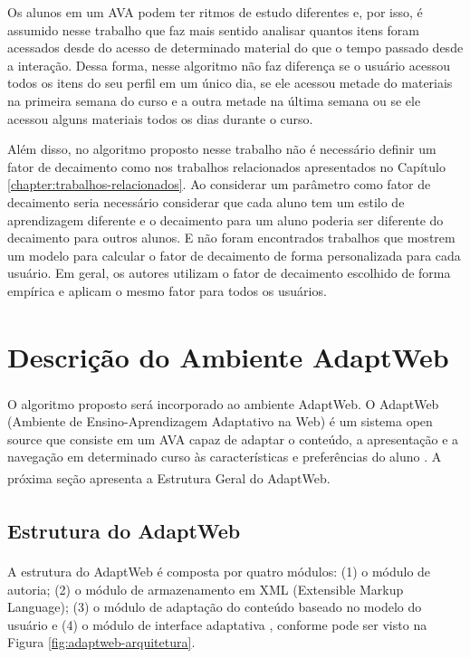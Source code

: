 Os alunos em um AVA podem ter ritmos de estudo diferentes e, por isso, é assumido nesse trabalho que faz
mais sentido analisar quantos itens foram acessados desde do acesso de determinado material do que o tempo passado desde
a interação. Dessa forma, nesse algoritmo não faz diferença se o usuário acessou todos os itens do seu perfil em um
único dia, se ele acessou metade do materiais na primeira semana do curso e a outra metade na última semana ou se ele
acessou alguns materiais todos os dias durante o curso.

Além disso, no algoritmo proposto nesse trabalho não é necessário definir um fator de decaimento como nos trabalhos
relacionados apresentados no Capítulo \ref{chapter:trabalhos-relacionados}. Ao considerar um parâmetro como fator de decaimento seria necessário considerar
que cada aluno tem um estilo de aprendizagem diferente e o decaimento para um aluno poderia ser diferente do decaimento
para outros alunos. E não foram encontrados trabalhos que mostrem um modelo para calcular o fator de decaimento de forma
personalizada para cada usuário. Em geral, os autores utilizam o fator de decaimento escolhido de forma empírica e
aplicam o mesmo fator para todos os usuários.

\section{Descrição do Ambiente AdaptWeb\textsuperscript{\textregistered}}

O algoritmo proposto será incorporado ao ambiente AdaptWeb\textsuperscript{\textregistered}. O
AdaptWeb\textsuperscript{\textregistered} (Ambiente de Ensino-Aprendizagem Adaptativo na Web) é um sistema open source
que consiste em um AVA capaz de adaptar o conteúdo, a apresentação e a navegação em determinado curso às características
e preferências do aluno \cite{gasparini2009adaptweb}. A próxima seção apresenta a Estrutura Geral do
AdaptWeb\textsuperscript{\textregistered}.

\subsection{Estrutura do AdaptWeb\textsuperscript{\textregistered}}

A estrutura do AdaptWeb\textsuperscript{\textregistered} é composta por quatro módulos: (1) o módulo de autoria; (2) o
módulo de armazenamento em XML (Extensible Markup Language); (3) o módulo de adaptação do conteúdo baseado no modelo do
usuário e (4) o módulo de interface adaptativa \cite{gasparini2003interface}, conforme pode ser visto na Figura
\ref{fig:adaptweb-arquitetura}.

